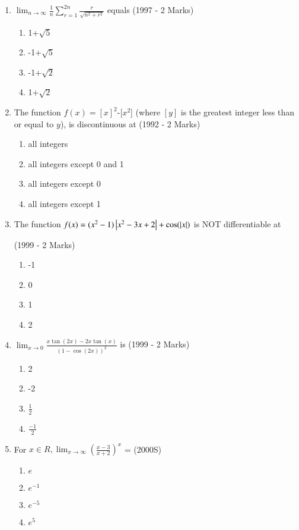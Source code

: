 \documentclass[journal,12pt,onecolumn]{IEEEtran}
\theoremstyle{remark}
\begin{document}
\begin{enumerate}
\item $\lim_{n\to \infty}\frac{1}{n}\sum_{r=1}^{2n}\frac{r}{\sqrt{n^2+r^2}}$ equals
\hfill(1997 - 2 Marks)
  \begin{enumerate}
      \item 1+$\sqrt{5}$
      \item -1+$\sqrt{5}$
      \item -1+$\sqrt{2}$
      \item 1+$\sqrt{2}$
      
  \end{enumerate}

\item The function $f(x)=[x]^2$-[$x^2$] (where $[y]$ is the greatest integer less than or equal to $y$), is discontinuous at
\hfill(1992 - 2 Marks)
     \begin{enumerate}
         \item all integers
         \item all integers except 0 and 1
         \item all integers except 0
         \item all integers except 1
         
     \end{enumerate}

\item The function $f(x)=(x^2-1)\left\vert x^2-3x+2\right\vert+\cos(\left\vert x\right\vert)$ is NOT differentiable at

  \hfill(1999 - 2 Marks)
     \begin{enumerate}
         \item -1
         \item 0
         \item 1
         \item 2
         
     \end{enumerate}

\item $\lim_{x\to0}$$\frac{x\tan(2x)-2x\tan(x)}{(1-\cos(2x))^2}$ is
  \hfill(1999 - 2 Marks)
    \begin{enumerate}
        \item 2
        
        \item -2

        \item $\frac{1}{2}$
        
        \item $\frac{-1}{2}$
        
    \end{enumerate}

\item For $x\in R, \lim_{x\to \infty}(\frac{x-3}{x+2})^x$ =
 \hfill(2000S)
   \begin{enumerate}
       \item $e$
       \item $e^{-1}$
       \item $e^{-5}$
       \item $e^{5}$
       
   \end{enumerate}

\end{enumerate}
\end{document}
